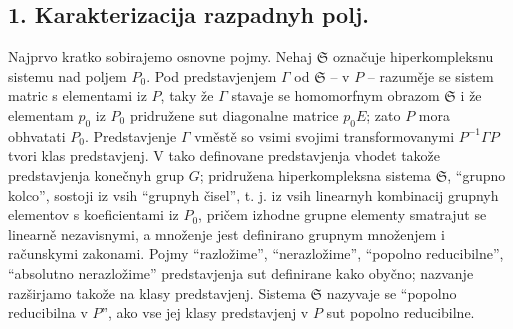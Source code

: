 \documentclass[11pt]{article}
\newcommand{\mS}{\mathfrak{S}}
\begin{document}
\subsection*{1. Karakterizacija razpadnyh polj.}

\noindent Najprvo kratko sobirajemo osnovne pojmy. Nehaj $\mS$ označuje hiperkompleksnu sistemu nad poljem $P_0$. Pod predstavjenjem $\Gamma$ od $\mS$ -- v $P$ -- razuměje se sistem matric s elementami iz $P$, taky že $\Gamma$ stavaje se homomorfnym obrazom $\mS$ i že elementam $p_0$ iz $P_0$ pridružene sut diagonalne matrice $p_0E$; zato $P$ mora obhvatati $P_0$. Predstavjenje $\Gamma$ vměstě so vsimi svojimi transformovanymi $P^{-1}\Gamma P$ tvori klas predstavjenj. V tako definovane predstavjenja vhodet takože predstavjenja konečnyh grup $G$; pridružena hiperkompleksna sistema $\mS$, “grupno kolco”, sostoji iz vsih “grupnyh čisel”, t. j. iz vsih linearnyh kombinacij grupnyh elementov s koeficientami iz $P_0$, pričem izhodne grupne elementy smatrajut se linearně nezavisnymi, a množenje jest definirano grupnym množenjem i računskymi zakonami. Pojmy “razložime”, “nerazložime”, “popolno reducibilne”, “absolutno nerazložime” predstavjenja sut definirane kako obyčno; nazvanje razširjamo takože na klasy predstavjenj. Sistema $\mS$ nazyvaje se “popolno reducibilna v $P$”, ako vse jej klasy predstavjenj v $P$ sut popolno reducibilne.
\end{document}
